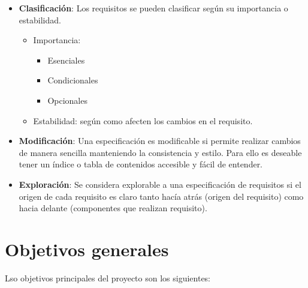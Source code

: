 \begin{itemize}
  \item \textbf{Clasificación}: Los requisitos se pueden clasificar según su importancia o estabilidad.
        \begin{itemize}
          \item Importancia:
                \begin{itemize}
                  \item Esenciales
                  \item Condicionales
                  \item Opcionales
                \end{itemize}
          \item Estabilidad: según como afecten los cambios en el requisito.
        \end{itemize}

  \item \textbf{Modificación}: Una especificación es modificable si permite realizar cambios de manera sencilla manteniendo la consistencia y estilo. Para ello es deseable tener un índice o tabla de contenidos accesible y fácil de entender.

  \item \textbf{Exploración}: Se considera explorable a una especificación de requisitos si el origen de cada requisito es claro tanto hacía atrás (origen del requisito) como hacia delante (componentes que realizan requisito).
\end{itemize}

\section{Objetivos generales}

Lso objetivos principales del proyecto son los siguientes:

